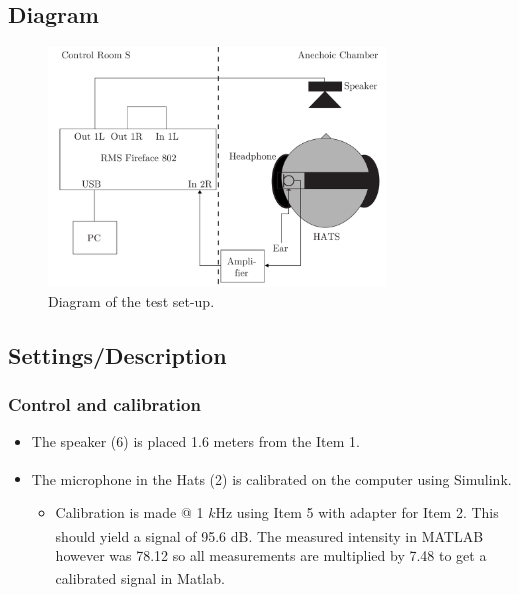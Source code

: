 \subsection{Diagram}
\begin{figure}[H]
	\centering
	\includegraphics[width=0.8\textwidth]{../Journal/Experiments/TestofConsumerHeadphones/OtherBrandsDiagram.pdf}
	\caption{Diagram of the test set-up.}
	\label{OtherBrandsDiagram}
\end{figure}

\subsection{Settings/Description}
\subsubsection{Control and calibration}
\begin{itemize}
	\item The speaker (6) is placed 1.6 meters from the Item 1.
	\item The microphone in the Hats (2) is calibrated on the computer using Simulink\textsuperscript{\textregistered}.
	\begin{itemize} 
		\item Calibration is made @ 1 $k$Hz using Item 5 with adapter for Item 2. This should yield a signal of 95.6 dB. The measured intensity in MATLAB\textsuperscript{\textregistered} however was 78.12 so all measurements are multiplied by 7.48 to get a calibrated signal in Matlab\textsuperscript{\textregistered}.
	\end{itemize}
\end{itemize}

